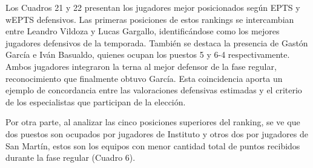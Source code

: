 \documentclass[
  12pt,
]{article}
\begin{document}
\begin{table}[H]
\centering
\caption{\label{tab:unnamed-chunk-39}Diez jugadores mejor valorados según wEPTS defensivo, estimados mediante Elastic Net.}
\centering
{}
\end{table}

Los Cuadros 21 y 22 presentan los jugadores mejor posicionados según
EPTS y wEPTS defensivos. Las primeras posiciones de estos rankings se
intercambian entre Leandro Vildoza y Lucas Gargallo, identificándose
como los mejores jugadores defensivos de la temporada. También se
destaca la presencia de Gastón García e Iván Basualdo, quienes ocupan
los puestos 5 y 6-4 respectivamente. Ambos jugadores integraron la terna
al mejor defensor de la fase regular, reconocimiento que finalmente
obtuvo García. Esta coincidencia aporta un ejemplo de concordancia entre
las valoraciones defensivas estimadas y el criterio de los especialistas
que participan de la elección.

Por otra parte, al analizar las cinco posiciones superiores del ranking,
se ve que dos puestos son ocupados por jugadores de Instituto y otros
dos por jugadores de San Martín, estos son los equipos con menor
cantidad total de puntos recibidos durante la fase regular (Cuadro 6).
\end{document}
